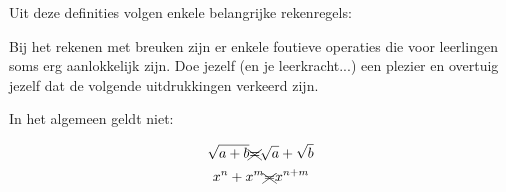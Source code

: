 \documentclass{ximera}
\begin{document}
Uit deze definities volgen enkele belangrijke rekenregels: 

\begin{proposition} \label{eig:rekenregels machten}\nl
 
    \savebox\strutbox{$\vphantom{\dfrac11^n}$}   %
 
 
 


\end{proposition}





Bij het rekenen met breuken zijn er enkele foutieve operaties die voor leerlingen soms erg aanlokkelijk zijn. 
Doe jezelf (en je leerkracht...) een plezier en overtuig jezelf dat de volgende uitdrukkingen verkeerd zijn. 

\begin{remark} In het algemeen geldt niet:
    
    \renewcommand\CancelColor{\color{red}}
    

$$ \sqrt{a+b} \xcancel{=} \sqrt{a} + \sqrt{b}$$ 
$$ x^n + x^m \xcancel{=} x^{n+m} $$      
    
\end{remark}
\end{document}
